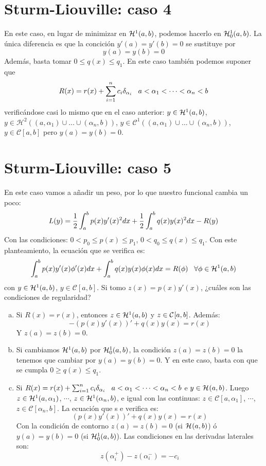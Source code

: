 \section{Sturm-Liouville: caso 4}

En este caso, en lugar de minimizar en $\sobolev{1}$, podemos hacerlo en $\sobolevcero{1}$. La única diferencia es que la concición $y'(a)=y'(b)=0$ se sustituye por
\[
y(a)=y(b)=0
\]
Además, basta tomar $0\leq q(x)\leq q_1$. En este caso también podemos suponer que 
\[
R(x)=r(x)+\sum_{i=1}^nc_i\delta_{\alpha_i} \espacio a<\alpha_1<\cdots<\alpha_n<b
\]
verificándose casi lo mismo que en el caso anterior: $y\in\sobolev{1}$, $y\in\mathcal{H}^2\left((a,\alpha_1)\cup\dots\cup(\alpha_n,b)\right)$, $y\in\mathcal{C}^1\left((a,\alpha_1)\cup\dots\cup(\alpha_n,b)\right)$, $y\in\mathcal{C}[a,b]$ pero $y(a)=y(b)=0$.

\section{Sturm-Liouville: caso 5}\label{slc5}

En este caso vamos a añadir un peso, por lo que nuestro funcional cambia un poco:
\[
L(y)=\frac{1}{2}\integral{a}{b}{p(x)y'(x)^2dx}+\frac{1}{2}\integral{a}{b}{q(x)y(x)^2dx}-R(y)
\]
Con las condiciones: $0<p_0\leq p(x) \leq p_1$, $0<q_0\leq q(x) \leq q_1$.
Con este planteamiento, la ecuación que se verifica es:
\[
\integral{a}{b}{p(x)y'(x)\phi'(x)dx}+\integral{a}{b}{q(x)y(x)\phi(x)dx}=R(\phi) \espacio \forall \phi\in\sobolev{1}
\]
con $y\in\sobolev{1}$, $y\in\mathcal{C}[a,b]$. Si tomo $z(x)=p(x)y'(x)$, ¿cuáles son las condiciones de regularidad?
\begin{enumerate}[(a)]
\item Si $R(x)=r(x)$, entonces $z\in\sobolev{1}$ y $z\in\continuas$. Además:
\[
-(p(x)y'(x))'+q(x)y(x)=r(x)
\]
Y $z(a)=z(b)=0$.
\item Si cambiamos $\sobolev{1}$ por $\sobolevcero{1}$, la condición $z(a)=z(b)=0$ la tenemos que cambiar por $y(a)=y(b)=0$. Y en este caso, basta con que se cumpla $0\geq q(x)\leq q_1$.
\item Si $R(x)=r(x)+\sum_{i=1}^nc_i\delta_{\alpha_i} \espacio a<\alpha_1<\cdots<\alpha_n<b$ e $y\in\sobolev{}$. Luego $z\in\sobolev[a,\alpha_1]{1}$, $\cdots$, $z\in\sobolev[\alpha_n,b]{1}$, e igual con las continuas: $z\in\mathcal{C}[a,\alpha_1]$, $\cdots$, $z\in\mathcal{C}[\alpha_n,b]$. La ecuación que s e verifica es:
\[
(p(x)y'(x))'+q(x)y(x)=r(x)
\]
Con la condición de contorno $z(a)=z(b)=0$ (si $\sobolev{}$) ó $y(a)=y(b)=0$ (si $\sobolevcero{1}$). Las condiciones en las derivadas laterales son:
\[
z(\alpha^+_i)-z(\alpha_i^-)=-c_i
\]
\end{enumerate}


